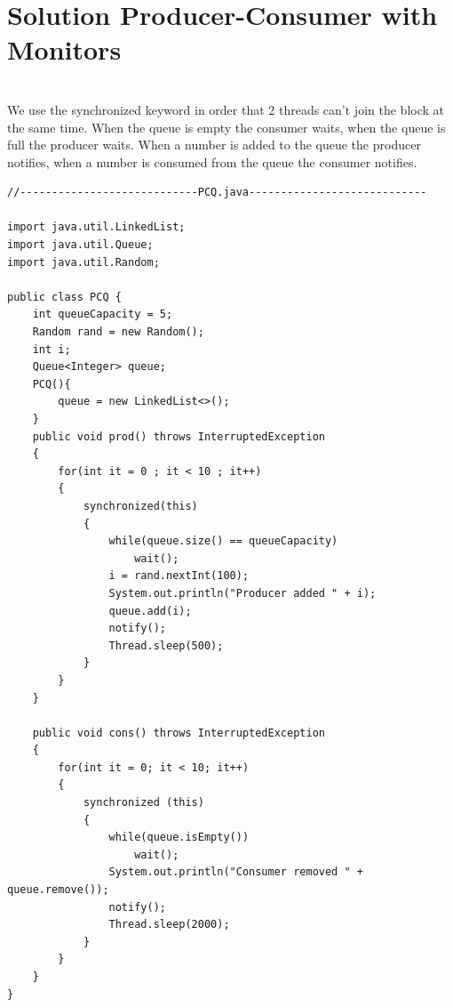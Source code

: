 \documentclass[14pt]{article}
\begin{document}
\section*{Solution Producer-Consumer with Monitors}\\
We use the synchronized keyword in order that 2 threads can't join the block at the same time. When the queue is empty the consumer waits, when the queue is full the producer waits. When a number is added to the queue the producer notifies, when a number is consumed from the queue the consumer notifies.
\begin{lstlisting}
//----------------------------PCQ.java----------------------------

import java.util.LinkedList;
import java.util.Queue;
import java.util.Random;

public class PCQ {
	int queueCapacity = 5;
	Random rand = new Random();
	int i;
	Queue<Integer> queue;
	PCQ(){
		queue = new LinkedList<>();
	}
	public void prod() throws InterruptedException
	{
		for(int it = 0 ; it < 10 ; it++)
		{
			synchronized(this)
			{
				while(queue.size() == queueCapacity)
					wait();
				i = rand.nextInt(100);
				System.out.println("Producer added " + i);
				queue.add(i);
				notify();
				Thread.sleep(500);
			}
		}
	}
	
	public void cons() throws InterruptedException
	{
		for(int it = 0; it < 10; it++)
		{
			synchronized (this)
			{
				while(queue.isEmpty())
					wait();
				System.out.println("Consumer removed " + queue.remove());
				notify();
				Thread.sleep(2000);
			}
		}
	}
}

\end{lstlisting}
\newpage
\end{document}
